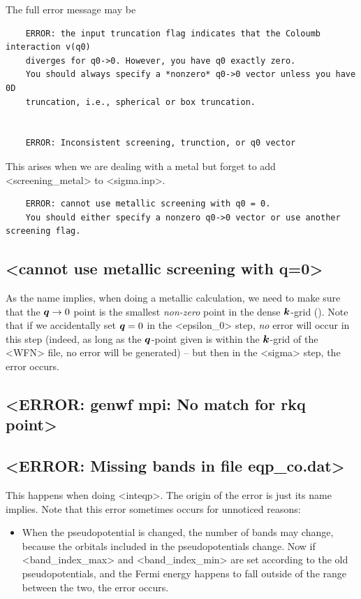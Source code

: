 \documentclass[hyperref, a4paper, 12pt]{report}
\def\texttt#1{<#1>}%
\newcommand{\shortcode}[1]{\texttt{#1}}
\begin{document}
The full error message may be 
\begin{lstlisting}
    ERROR: the input truncation flag indicates that the Coloumb interaction v(q0)
    diverges for q0->0. However, you have q0 exactly zero.
    You should always specify a *nonzero* q0->0 vector unless you have 0D 
    truncation, i.e., spherical or box truncation.

    
    ERROR: Inconsistent screening, trunction, or q0 vector    
\end{lstlisting}
This arises when we are dealing with a metal 
but forget to add \shortcode{screening_metal} to \shortcode{sigma.inp}.

\begin{lstlisting}
    ERROR: cannot use metallic screening with q0 = 0.
    You should either specify a nonzero q0->0 vector or use another screening flag.
\end{lstlisting}

\subsection{\shortcode{cannot use metallic screening with q=0}}

As the name implies, 
when doing a metallic calculation,
we need to make sure that the $\vb*{q} \to 0$ point 
is the smallest \emph{non-zero} point in the dense $\vb*{k}$-grid 
().
Note that if we accidentally set $\vb*{q} = 0$ in the \shortcode{epsilon_0} step, 
\emph{no} error will occur in this step 
(indeed, as long as the $\vb*{q}$-point given is within the $\vb*{k}$-grid of the \shortcode{WFN} file, 
no error will be generated) -- 
but then in the \shortcode{sigma} step, 
the error occurs.

\subsection{\shortcode{ERROR: genwf mpi: No match for rkq point}}

\subsection{\shortcode{ERROR: Missing bands in file eqp_co.dat}}

This happens when doing \shortcode{inteqp}.
The origin of the error is just its name implies.
Note that this error sometimes occurs for unnoticed reasons:
\begin{itemize}
    \item When the pseudopotential is changed, 
    the number of bands may change,
    because the orbitals included in the pseudopotentials change.
    Now if \shortcode{band_index_max} and \shortcode{band_index_min}
    are set according to the old pseudopotentials,
    and the Fermi energy happens to fall outside of the range between the two,
    the error occurs.
\end{itemize}
\end{document}
